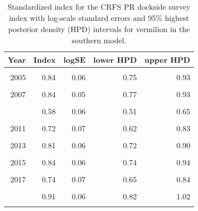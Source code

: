 \documentclass[
]{article}
\begin{document}
\begin{table}

\caption{\label{tab:tab-index-crfspr}Standardized index for the CRFS PR dockside survey index with log-scale standard errors and 95\% highest
       posterior density (HPD) intervals for vermilion in the southern model.}
\centering
\begin{tabular}[t]{rrrrr}
\toprule
Year & Index & logSE & lower HPD & upper HPD\\
\midrule
\cellcolor{gray!6}{2004} & \cellcolor{gray!6}{1.36} & \cellcolor{gray!6}{0.05} & \cellcolor{gray!6}{1.23} & \cellcolor{gray!6}{1.49}\\
2005 & 0.84 & 0.06 & 0.75 & 0.93\\
\cellcolor{gray!6}{2006} & \cellcolor{gray!6}{0.80} & \cellcolor{gray!6}{0.05} & \cellcolor{gray!6}{0.72} & \cellcolor{gray!6}{0.89}\\
2007 & 0.84 & 0.05 & 0.77 & 0.93\\
\cellcolor{gray!6}{2008} & \cellcolor{gray!6}{0.67} & \cellcolor{gray!6}{0.05} & \cellcolor{gray!6}{0.60} & \cellcolor{gray!6}{0.74}\\
\addlinespace
2009 & 0.58 & 0.06 & 0.51 & 0.65\\
\cellcolor{gray!6}{2010} & \cellcolor{gray!6}{0.61} & \cellcolor{gray!6}{0.07} & \cellcolor{gray!6}{0.53} & \cellcolor{gray!6}{0.70}\\
2011 & 0.72 & 0.07 & 0.62 & 0.83\\
\cellcolor{gray!6}{2012} & \cellcolor{gray!6}{0.69} & \cellcolor{gray!6}{0.07} & \cellcolor{gray!6}{0.60} & \cellcolor{gray!6}{0.80}\\
2013 & 0.81 & 0.06 & 0.72 & 0.90\\
\addlinespace
\cellcolor{gray!6}{2014} & \cellcolor{gray!6}{0.85} & \cellcolor{gray!6}{0.06} & \cellcolor{gray!6}{0.76} & \cellcolor{gray!6}{0.95}\\
2015 & 0.84 & 0.06 & 0.74 & 0.94\\
\cellcolor{gray!6}{2016} & \cellcolor{gray!6}{0.73} & \cellcolor{gray!6}{0.07} & \cellcolor{gray!6}{0.64} & \cellcolor{gray!6}{0.83}\\
2017 & 0.74 & 0.07 & 0.65 & 0.84\\
\cellcolor{gray!6}{2018} & \cellcolor{gray!6}{0.65} & \cellcolor{gray!6}{0.07} & \cellcolor{gray!6}{0.56} & \cellcolor{gray!6}{0.74}\\
\addlinespace
2019 & 0.91 & 0.06 & 0.82 & 1.02\\
\cellcolor{gray!6}{2020} & \cellcolor{gray!6}{0.77} & \cellcolor{gray!6}{0.17} & \cellcolor{gray!6}{0.55} & \cellcolor{gray!6}{1.05}\\
\bottomrule
\end{tabular}
\end{table}
\end{document}

